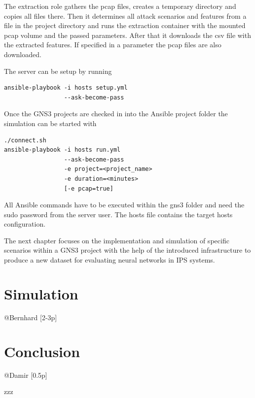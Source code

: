 \documentclass[conference]{IEEEtran}
\begin{document}
The extraction role gathers the pcap files, creates a temporary directory and copies all files there. Then it determines all attack scenarios and features from a file in the project directory and runs the extraction container with the mounted pcap volume and the passed parameters. After that it downloads the csv file with the extracted features. If specified in a parameter the pcap files are also downloaded.

The server can be setup by running
\begin{verbatim}
ansible-playbook -i hosts setup.yml 
                 --ask-become-pass
\end{verbatim}

Once the GNS3 projects are checked in into the Ansible project folder the simulation can be started with
\begin{verbatim}
./connect.sh
ansible-playbook -i hosts run.yml
                 --ask-become-pass
                 -e project=<project_name>
                 -e duration=<minutes>
                 [-e pcap=true]
\end{verbatim}

All Ansible commands have to be executed within the gns3 folder and need the sudo password from the server user. The hosts file contains the target hosts configuration.

The next chapter focuses on the implementation and simulation of specific scenarios within a GNS3 project with the help of the introduced infrastructure to produce a new dataset for evaluating neural networks in IPS systems.  

\section{Simulation}
@Bernhard [2-3p]

\section{Conclusion}
@Damir [0.5p]

\begin{thebibliography}{00}
 zzz
\end{thebibliography}
\end{document}
